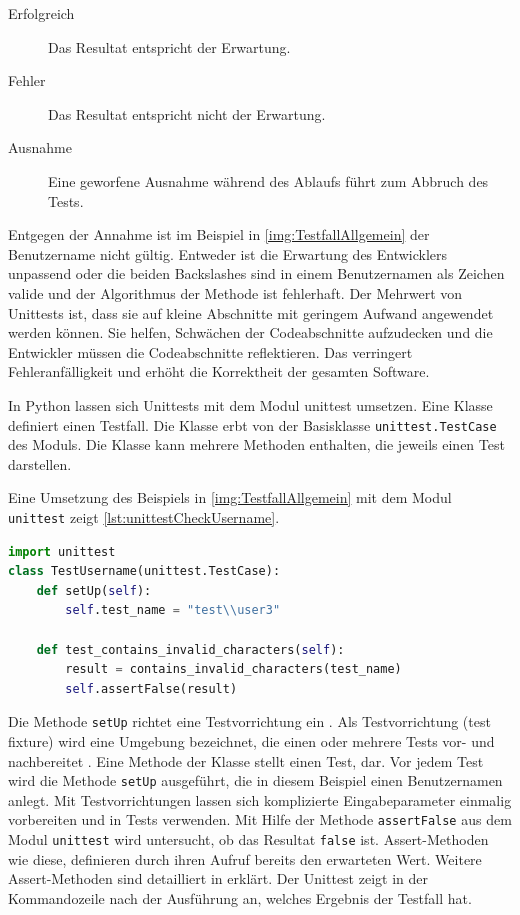 \documentclass[a4paper,titlepage,halfparskip,12pt]{scrreprt}
\begin{document}
\begin{onehalfspacing}
\begin{description}
\item[Erfolgreich] Das Resultat entspricht der Erwartung.
\item[Fehler] Das Resultat entspricht nicht der Erwartung.
\item[Ausnahme] Eine geworfene Ausnahme während des Ablaufs führt zum Abbruch des Tests.
\end{description}

Entgegen der Annahme ist im Beispiel in \autoref{img:TestfallAllgemein} der Benutzername nicht gültig. Entweder ist die Erwartung des Entwicklers unpassend oder die beiden Backslashes sind in einem Benutzernamen als Zeichen valide und der Algorithmus der Methode ist fehlerhaft. Der Mehrwert von Unittests ist, dass sie auf kleine Abschnitte mit geringem Aufwand angewendet werden können. Sie helfen, Schwächen der Codeabschnitte aufzudecken und die Entwickler müssen die Codeabschnitte reflektieren. Das verringert Fehleranfälligkeit und erhöht die Korrektheit der gesamten Software.\cite{hubertz2016softwaretests}

In Python lassen sich Unittests mit dem Modul unittest umsetzen. Eine Klasse definiert einen Testfall. Die Klasse erbt von der Basisklasse \texttt{unittest.TestCase} des Moduls. Die Klasse kann mehrere Methoden enthalten, die jeweils einen Test darstellen.\cite{hubertz2016softwaretests}

\pagebreak

Eine Umsetzung des Beispiels in \autoref{img:TestfallAllgemein} mit dem Modul \texttt{unittest} zeigt \autoref{lst:unittestCheckUsername}.

\begin{lstlisting}[language=python, caption={Beispiel: Unittest für eine Methode zur Überprüfung eines Benutzernamens des \acs{IMS}}, label={lst:unittestCheckUsername}]
import unittest
class TestUsername(unittest.TestCase):
    def setUp(self):
        self.test_name = "test\\user3"

    def test_contains_invalid_characters(self):
        result = contains_invalid_characters(test_name)
        self.assertFalse(result)
\end{lstlisting}

Die Methode \texttt{setUp} richtet eine Testvorrichtung ein \cite{hubertz2016softwaretests}.
Als Testvorrichtung (test fixture) wird eine Umgebung bezeichnet, die einen oder mehrere Tests vor- und nachbereitet \cite{hubertz2016softwaretests}. Eine Methode der Klasse stellt einen Test, dar. Vor jedem Test wird die Methode \texttt{setUp} ausgeführt, die in diesem Beispiel einen Benutzernamen anlegt. Mit Testvorrichtungen lassen sich komplizierte Eingabeparameter einmalig vorbereiten und in Tests verwenden. Mit Hilfe der Methode \texttt{assertFalse} aus dem Modul \texttt{unittest} wird untersucht, ob das Resultat \texttt{false} ist. Assert-Methoden wie diese, definieren durch ihren Aufruf bereits den erwarteten Wert. Weitere Assert-Methoden sind detailliert in \cite{hubertz2016softwaretests} erklärt. Der Unittest zeigt in der Kommandozeile nach der Ausführung an, welches Ergebnis der Testfall hat.


\end{onehalfspacing}
\end{document}

